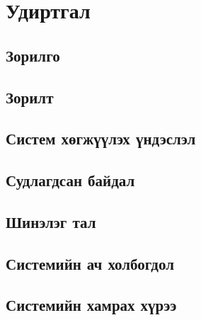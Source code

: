 
{}
\label{Introduction} %

\section*{Удиртгал}

    \subsection*{Зорилго}
    
    \subsection*{Зорилт}

    \subsection*{Систем хөгжүүлэх үндэслэл}
    
    \subsection*{Судлагдсан байдал}

    \subsection*{Шинэлэг тал}

    \subsection*{Системийн ач холбогдол}

    \subsection*{Системийн хамрах хүрээ}